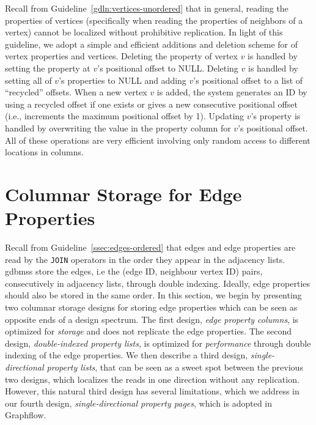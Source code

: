 
Recall from Guideline~\ref{gdln:vertices-unordered} that in general, reading the properties of vertices (specifically when reading the properties of neighbors of a vertex) cannot be localized without prohibitive replication. In light of this guideline, we adopt a simple and efficient additions and deletion scheme for of vertex properties and vertices. Deleting  the property of vertex $v$ is handled by setting the property at $v$'s positional offset to NULL.  Deleting $v$ is handled by setting all of $v$'s properties to NULL and adding $v$'s positional offset to a list of ``recycled'' offsets. When a new vertex $v$ is added, the system generates an ID by using a recycled offset if one exists or gives a new consecutive positional offset (i.e., increments the maximum positional offset by 1). Updating $v$'s property is handled by overwriting the value in the property column for $v$'s positional offset. All of these operations are very efficient involving only random access to different locations in columns.

\section{Columnar Storage for Edge Properties}
\label{sec:edge-property-columns}

Recall from Guideline~\ref{ssec:edges-ordered} that edges and edge properties  are read by the \texttt{JOIN} operators in the order they appear in the adjacency lists. \gls{gdbms}s store the edges, i.e the (edge ID, neighbour vertex ID) pairs, consecutively in adjacency lists, through double indexing. Ideally, edge properties should also be stored in the same order. In this section, we begin by presenting two columnar storage designs for storing edge properties which can be seen as opposite ends of a design spectrum. The first design, {\em edge property columns}, is optimized for \emph{storage} and does not replicate the edge properties. The second design, {\em double-indexed property lists}, is optimized for \emph{performance} through double indexing of the edge properties. We then describe a third design, {\em single-directional property lists}, that can be seen as a sweet spot between the previous two designs, which localizes the reads in one direction without any replication. However, this natural third design has several limitations, which we address in our fourth design, {\em single-directional property pages}, which is adopted in Graphflow. 

